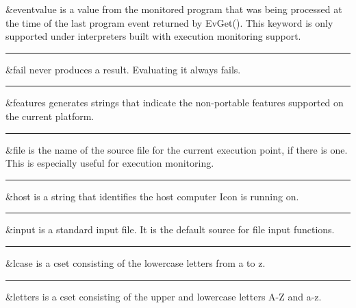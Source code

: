 \noindent
{}\textsf{\&eventvalue} is a value
from the monitored program that was being processed at the time of the
last program event returned by \textsf{EvGet()}. This keyword is only
supported under interpreters built with execution monitoring support.

\bigskip\hrule\vspace{0.1cm}

\noindent
{}\textsf{\&fail} never produces a
result. Evaluating it always fails.

\bigskip\hrule\vspace{0.1cm}

\noindent
{}\textsf{\&features} generates strings that indicate the
non-portable features supported on the current platform.

\bigskip\hrule\vspace{0.1cm}

\noindent
\textsf{\&file} is the name of the source file for
the current execution point, if there is one. This is especially useful
for execution monitoring.

\bigskip\hrule\vspace{0.1cm}

\noindent
{}\textsf{\&host} is a string that
identifies the host computer Icon is running on.

\bigskip\hrule\vspace{0.1cm}

\noindent
{}\textsf{\&input} is a standard input
file. It is the default source for file input functions.

\bigskip\hrule\vspace{0.1cm}

\noindent
{}\textsf{\&lcase} is a cset consisting of
the lowercase letters from a to z.

\bigskip\hrule\vspace{0.1cm}

\noindent
{}\textsf{\&letters} is a cset consisting
of the upper and lowercase letters A-Z and a-z.

